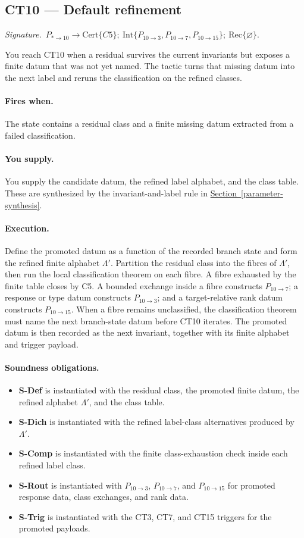 \documentclass[
  11pt,
]{article}
\providecommand{\tightlist}{%
  \setlength{\itemsep}{0pt}\setlength{\parskip}{0pt}}
\theoremstyle{definition}
\newcommand{\secref}[1]{\hyperref[#1]{Section~\ref*{#1}}}
\newcommand{\ctsignature}[1]{\par\noindent\emph{Signature.}\ #1\par\medskip}
\newcommand{\ctcert}[1]{\mathrm{Cert}\{#1\}}
\newcommand{\ctint}[1]{\mathrm{Int}\{#1\}}
\newcommand{\ctrec}[1]{\mathrm{Rec}\{#1\}}
\newcommand{\ctnone}{\varnothing}
\newcommand{\ctpar}[1]{\paragraph{#1.}}
\begin{document}
\subsection{CT10 --- Default refinement}\label{ct:10}\label{the-default-refinement}
\ctsignature{\(P_{\ast\to10}\to \ctcert{C5};\ \ctint{P_{10\to3},P_{10\to7},P_{10\to15}};\ \ctrec{\ctnone}\).}

You reach CT10 when a residual survives the current invariants but
exposes a finite datum that was not yet named.  The tactic turns that
missing datum into the next label and reruns the classification on the
refined classes.

\ctpar{Fires when}
The state contains a residual class and a finite missing datum extracted
from a failed classification.

\ctpar{You supply}
You supply the candidate datum, the refined label alphabet, and the class
table.  These are synthesized by the invariant-and-label rule in
\secref{parameter-synthesis}.

\ctpar{Execution}
Define the promoted datum as a function of the recorded branch state and
form the refined finite alphabet \(\Lambda'\).  Partition the residual
class into the fibres of \(\Lambda'\), then run the local classification
theorem on each fibre.  A fibre exhausted by the finite table closes by
C5.  A bounded exchange inside a fibre constructs \(P_{10\to7}\); a
response or type datum constructs \(P_{10\to3}\); and a target-relative
rank datum constructs \(P_{10\to15}\).  When a fibre remains
unclassified, the classification theorem must name the next branch-state
datum before CT10 iterates.  The promoted datum is then recorded as the
next invariant, together with its finite alphabet and trigger payload.

\ctpar{Soundness obligations}
\begin{itemize}
\tightlist
\item \textbf{S-Def} is instantiated with the residual class, the promoted finite datum, the refined alphabet \(\Lambda'\), and the class table.
\item \textbf{S-Dich} is instantiated with the refined label-class alternatives produced by \(\Lambda'\).
\item \textbf{S-Comp} is instantiated with the finite class-exhaustion check inside each refined label class.
\item \textbf{S-Rout} is instantiated with \(P_{10\to3}\), \(P_{10\to7}\), and \(P_{10\to15}\) for promoted response data, class exchanges, and rank data.
\item \textbf{S-Trig} is instantiated with the CT3, CT7, and CT15 triggers for the promoted payloads.
\end{itemize}
\end{document}
